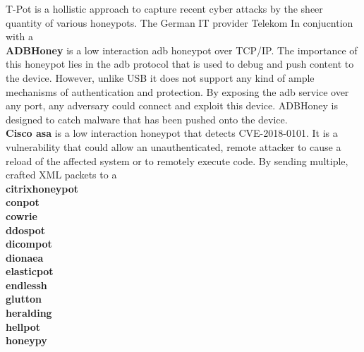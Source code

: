 T-Pot is a hollistic approach to capture recent cyber attacks by the sheer quantity of various honeypots.
The German IT provider Telekom  
In conjucntion with a \\

\textbf{ADBHoney} \cite{adbhoney2021} is a low interaction \ac{adb} honeypot over TCP/IP.
The importance of this honeypot lies in the \ac{adb} protocol that is used to debug and push content to the device.
However, unlike USB it does not support any kind of ample mechanisms of authentication and protection.
By exposing the \ac{adb} service over any port, any adversary could connect and exploit this device.
ADBHoney is designed to catch malware that has been pushed onto the device.\\

\textbf{Cisco \ac{asa}} \cite{cymmetria2018} is a low interaction honeypot that detects CVE-2018-0101.
It is a vulnerability that could allow an unauthenticated, remote attacker to cause a reload of the affected system or to remotely execute code.
By sending multiple, crafted XML packets to a  \\

\textbf{citrixhoneypot} \cite{citrixhoneypot2020}\\

\textbf{conpot} \cite{conpot2021}\\

\textbf{cowrie} \cite{cowire2021}\\

\textbf{ddospot} \cite{ddosspot2021}\\

\textbf{dicompot} \cite{dicompot2021}\\

\textbf{dionaea} \cite{dionaea2021}\\

\textbf{elasticpot} \cite{elasticpot2021}\\

\textbf{endlessh} \cite{endlessh2021}\\

\textbf{glutton} \cite{glutton2021}\\

\textbf{heralding} \cite{heralding2021}\\

\textbf{hellpot} \cite{hellpot2021}\\

\textbf{honeypy} \cite{honeysap2021}\\

